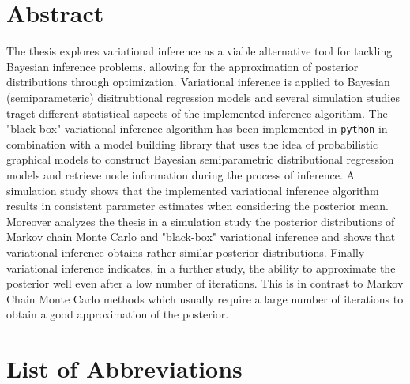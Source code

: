 \clearpage
{}


\section*{Abstract}

The thesis explores variational inference as a viable alternative tool for 
tackling Bayesian inference problems, allowing for the approximation of 
posterior distributions through optimization. Variational inference is applied 
to Bayesian (semiparameteric) 
disitrubtional regression models and several simulation studies traget 
different statistical aspects of the implemented inference algorithm. The "black-box" 
variational inference algorithm has been implemented in \verb|python| in 
combination with a model building library that uses the idea of probabilistic 
graphical models to construct Bayesian semiparametric distributional regression 
models and retrieve node information during the process of inference. A simulation 
study shows that the implemented variational inference algorithm results in 
consistent parameter estimates when considering the posterior mean. 
Moreover analyzes the thesis in a simulation study the posterior distributions 
of Markov chain Monte Carlo and "black-box" variational inference and shows 
that variational inference obtains rather similar posterior distributions. 
Finally variational inference indicates, in a further study, the ability to 
approximate the posterior well even after a low number of iterations. 
This is in contrast to Markov Chain Monte Carlo methods which usually require a 
large number of iterations to obtain a good approximation of the posterior.

\clearpage

\tableofcontents
\clearpage

\listoffigures

\listofalgorithms 

\listoftables

\section*{List of Abbreviations}

